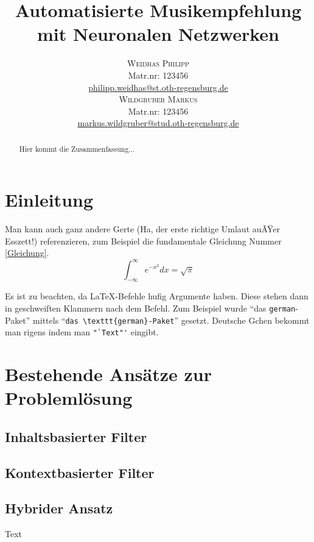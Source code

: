 \documentclass[twosided,a4,10pt]{article}
\title{\vspace{-5mm}%
	\fontsize{20pt}{10pt}\selectfont
	\textbf{Automatisierte Musikempfehlung mit Neuronalen Netzwerken}
	}
\author{
	\large
       \begin{minipage}[t]{0.5\linewidth}
         \begin{center}
           	\textsc{Weidhas Philipp}\\[2mm]
                 \normalsize	Matr.nr: 123456\\
                 \normalsize
                 \href{mailto:philipp.weidhas@st.oth-regensburg.de}
                 {philipp.weidhas@st.oth-regensburg.de}      
         \end{center}
       \end{minipage}        
       \begin{minipage}[t]{0.5\linewidth}
         \begin{center}
           	\textsc{Wildgruber Markus}\\[2mm]
                 \normalsize	Matr.nr: 123456\\
                 \normalsize
                 \href{mailto:markus.wildgruber@stud.oth-regensburg.de}
                 {markus.wildgruber@stud.oth-regensburg.de}      
         \end{center}
       \end{minipage}
     }
\begin{document}
\maketitle
\thispagestyle{fancy}

	

\begin{multicols}{2}

\begin{abstract}
\noindent Hier kommt die Zusammenfassung...
\end{abstract}


\section{Einleitung}

Man kann auch ganz andere Gerte (Ha, der erste richtige Umlaut auÃŸer
Esszett!) referenzieren, zum Beispiel die fundamentale Gleichung Nummer
\ref{Gleichung}.
\begin{equation}\label{Gleichung}
\int^{\infty}_{-\infty} e^{-x^{2}}dx = \sqrt{\pi} 
\end{equation}

Es ist zu beachten, da \LaTeX-Befehle hufig Argumente haben. Diese stehen
dann in geschweiften Klammern nach dem Befehl. Zum Beispiel wurde "`das
\texttt{german}-Paket"' mittels "`\verb+das \texttt{german}-Paket+"'
gesetzt. Deutsche Gchen bekommt man rigens indem man \verb+"`Text"'+
eingibt. 

\section{Bestehende Ansätze zur Problemlösung}

\subsection{Inhaltsbasierter Filter}

\subsection{Kontextbasierter Filter}

\subsection{Hybrider Ansatz}
Text


\end{multicols}
\end{document}
